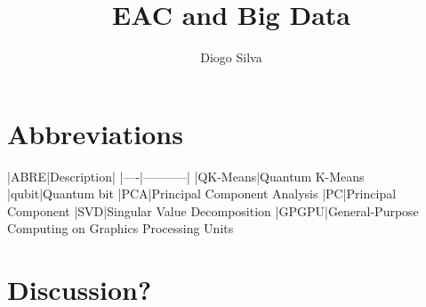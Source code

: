 \documentclass[10pt,a4paper,final]{article}
\author{Diogo Silva}
\title{EAC and Big Data}
\begin{document}
\onehalfspacing %

\section{Abbreviations}

|ABRE|Description|
|----|-----------|
|QK-Means|Quantum K-Means
|qubit|Quantum bit
|PCA|Principal Component Analysis
|PC|Principal Component
|SVD|Singular Value Decomposition
|GPGPU|General-Purpose Computing on Graphics Processing Units



\tableofcontents













\section{Discussion?}



\end{document}
